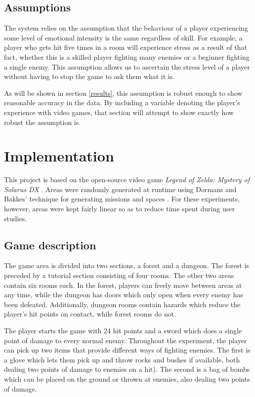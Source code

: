\documentclass[a4paper]{article}
\begin{document}
\begin{multicols*}{2}
\subsection{Assumptions}
The system relies on the assumption that the behaviour of a player experiencing some level of emotional intensity is the same regardless of skill. For example, a player who gets hit five times in a room will experience stress as a result of that fact, whether this is a skilled player fighting many enemies or a beginner fighting a single enemy. This assumption allows us to ascertain the stress level of a player without having to stop the game to ask them what it is.

As will be shown in section \ref{results}, this assumption is robust enough to show reasonable accuracy in the data. By including a variable denoting the player's experience with video games, that section will attempt to show exactly how robust the assumption is.

\section{Implementation}
This project is based on the open-source video game \emph{Legend of Zelda: Mystery of Solarus DX} \cite{zeldasolarus}. Areas were randomly generated at runtime using Dormans and Bakkes' technique for generating missions and spaces \cite{missiongrammar}. For these experiments, however, areas were kept fairly linear so as to reduce time spent during user studies. 

\subsection{Game description}
The game area is divided into two sections, a forest and a dungeon. The forest is preceded by a tutorial section consisting of four rooms. The other two areas contain six rooms each. In the forest, players can freely move between areas at any time, while the dungeon has doors which only open when every enemy has been defeated. Additionally, dungeon rooms contain hazards which reduce the player's hit points on contact, while forest rooms do not.

The player starts the game with 24 hit points and a sword which does a single point of damage to every normal enemy. Throughout the experiment, the player can pick up two items that provide different ways of fighting enemies. The first is a glove which lets them pick up and throw rocks and bushes if available, both dealing two points of damage to enemies on a hit). The second is a bag of bombs which can be placed on the ground or thrown at enemies, also dealing two points of damage. 


\end{multicols*}
\end{document}
